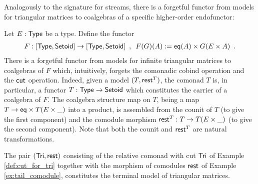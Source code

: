 \documentclass[a4paper,USenglish]{lipics}
\begin{document}
Analogously to the signature for streams, there is a forgetful functor from models for triangular matrices to coalgebras of a specific higher-order
endofunctor:

\begin{rem}
  Let $E : \mathsf{Type}$ be a type. Define the functor
  \begin{align*}  F: [\mathsf{Type},\mathsf{Setoid}] \to [\mathsf{Type},\mathsf{Setoid}]  \enspace ,\enspace
                      F(G)(A) := \mathsf{eq}(A) \times G(E \times A) \enspace .
  \end{align*}
  There is a forgetful functor from models for infinite triangular matrices to coalgebras of $F$ which, intuitively, forgets the comonadic cobind operation and the $\mathsf{cut}$ operation.
  Indeed, given a model $(T,\mathsf{rest}^T)$, the comonad $T$ is, in particular, a functor $T:\mathsf{Type}\to\mathsf{Setoid}$ which constitutes the carrier of 
  a coalgebra of $F$. The coalgebra structure map on $T$, being a map $T \to \mathsf{eq} \times T(E\times \_ )$ into a product, 
  is assembled from the counit of $T$ (to give the first component) 
  and the comodule morphism $\mathsf{rest}^T : T \to T(E\times \_)$ (to give the second component).
  Note that both the counit and $\mathsf{rest}^T$ are natural transformations.
\end{rem}


   

\begin{theorem}\label{thm:final_sem_tri} 
   The pair $(\mathsf{Tri}, \mathsf{rest})$ consisting of the relative comonad with cut $\mathsf{Tri}$ of Example \ref{def:cut_for_tri} together with 
    the morphism of comodules $\mathsf{rest}$ of Example \ref{ex:tail_comodule},
   constitutes the terminal model of triangular matrices.
\end{theorem}
\end{document}
